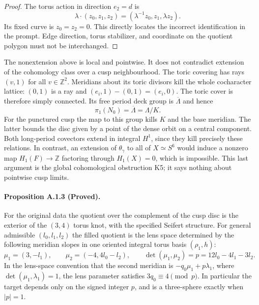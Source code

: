 \begin{proof}
The torus action in direction $e_2=d$ is
\[
 \lambda\cdot(z_0,z_1,z_2)
       =(\lambda^{-1}z_0,z_1,\lambda z_2).
\]
Its fixed curve is $z_0=z_2=0$.  This directly locates the
incorrect identification in the prompt.  Edge direction,
torus stabilizer, and coordinate on the quotient polygon must
not be interchanged.
\end{proof}

The nonextension above is local and pointwise.  It does not
contradict extension of the cohomology class over a cusp
neighbourhood.  The toric covering has rays $(v,1)$ for all
$v\in\mathbb Z^2$.  Meridians about its toric divisors kill
the whole cocharacter lattice: $(0,1)$ is a ray and
$(e_i,1)-(0,1)=(e_i,0)$.  The toric cover is therefore simply
connected.  Its free period deck group is $\overline\Lambda$
and hence
\[
 \pi_1(N_0)=\overline\Lambda=\Lambda/K.
 \tag{A.1.5}
\]
For the punctured cusp the map to this group kills $K$ and
the base meridian.  The latter bounds the disc given by a
point of the dense orbit on a central component.  Both
long-period covectors extend in integral $H^1$, since they
kill precisely these relations.  In contrast, an extension
of $\theta_\gamma$ to all of $X\simeq S^6$ would induce a
nonzero map $H_1(F)\to\mathbb Z$ factoring through
$H_1(X)=0$, which is impossible.  This last argument is the
global cohomological obstruction K5; it says nothing about
pointwise cusp limits.

\paragraph{Proposition A.1.3 (Proved).}
For the original data the quotient over the complement of
the cusp disc is the exterior of the $(3,4)$ torus knot,
with the specified Seifert structure.  For general admissible
$(l_0,l_1,l_2)$ the filled quotient is the lens space determined
by the following meridian slopes in one oriented integral
torus basis $(\rho_1,h)$:
\[
 \mu_1=(3,-l_1),\qquad
 \mu_2=(-4,4l_0-l_2),\qquad
 \det(\mu_1,\mu_2)=p=12l_0-4l_1-3l_2.
 \tag{A.1.6}
\]
In the lens-space convention that the second meridian is
$-q_0\mu_1+p\lambda_1$, where
$\det(\mu_1,\lambda_1)=1$, the lens parameter satisfies
$3q_0\equiv4\pmod p$.  In particular the target depends only
on the signed integer $p$, and is a three-sphere exactly
when $|p|=1$.


